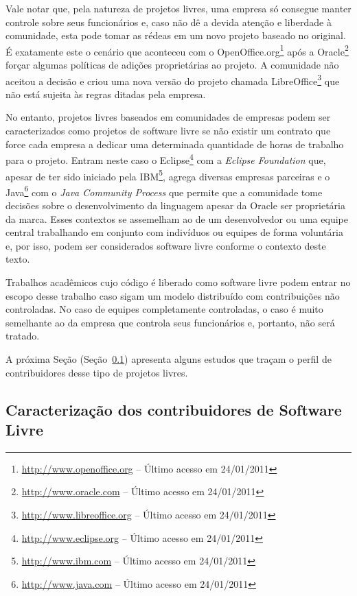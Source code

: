 Vale notar que, pela natureza de projetos livres, uma empresa só
consegue manter controle sobre seus funcionários e, caso não dê a
devida atenção e liberdade à comunidade, esta pode tomar as rédeas em
um novo projeto baseado no original.  É exatamente este o cenário que
aconteceu com o
OpenOffice.org\footnote{\url{http://www.openoffice.org} -- Último
  acesso em 24/01/2011} após a
Oracle\footnote{\url{http://www.oracle.com} -- Último acesso em
  24/01/2011} forçar algumas políticas de adições proprietárias ao
projeto. A comunidade não aceitou a decisão e criou uma nova versão do
projeto chamada LibreOffice\footnote{\url{http://www.libreoffice.org}
  -- Último acesso em 24/01/2011} que não está sujeita às regras
ditadas pela empresa.

No entanto, projetos livres baseados em comunidades de empresas podem
ser caracterizados como projetos de software livre se não existir um
contrato que force cada empresa a dedicar uma determinada quantidade
de horas de trabalho para o projeto. Entram neste caso o
Eclipse\footnote{\url{http://www.eclipse.org} -- Último acesso em
  24/01/2011} com a \emph{Eclipse Foundation} que, apesar de ter sido
iniciado pela IBM\footnote{\url{http://www.ibm.com} -- Último acesso
  em 24/01/2011}, agrega diversas empresas parceiras e o
Java\footnote{\url{http://www.java.com} -- Último acesso em
  24/01/2011} com o \emph{Java Community Process} que permite que a
comunidade tome decisões sobre o desenvolvimento da linguagem apesar
da Oracle ser proprietária da marca. Esses contextos se assemelham ao
de um desenvolvedor ou uma equipe central trabalhando em conjunto com
indivíduos ou equipes de forma voluntária e, por isso, podem ser
considerados software livre conforme o contexto deste texto.

Trabalhos acadêmicos cujo código é liberado como software livre podem
entrar no escopo desse trabalho caso sigam um modelo distribuído com
contribuições não controladas. No caso de equipes completamente
controladas, o caso é muito semelhante ao da empresa que controla seus
funcionários e, portanto, não será tratado.

A próxima Seção (Seção~\ref{subsec:caracterizacao}) apresenta
alguns estudos que traçam o perfil de contribuidores desse tipo de
projetos livres.

\subsection{Caracterização dos contribuidores de Software Livre}
\label{subsec:caracterizacao}

